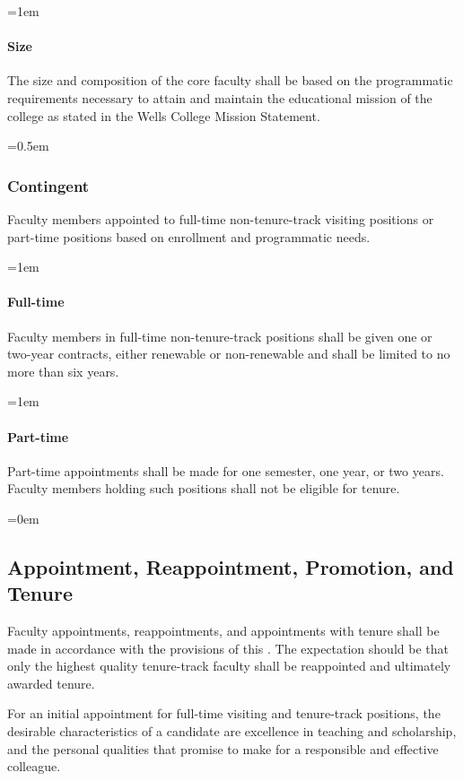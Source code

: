 \documentclass{manual}
\let\oldsubsection\subsection
\renewcommand\subsection{\leftskip=0em\oldsubsection}
\let\oldsubsubsection\subsubsection
\renewcommand\subsubsection{\leftskip=0.5em\oldsubsubsection}
\let\oldparagraph\paragraph
\renewcommand\paragraph{\leftskip=1em\oldparagraph}
\begin{document}
\paragraph{Size} 
The size and composition of the core faculty shall be based on the programmatic requirements necessary to attain and maintain the educational mission of the college as stated in the Wells College Mission Statement.

\subsubsection{Contingent}
Faculty members appointed to full-time non-tenure-track visiting positions or part-time positions based on enrollment and programmatic needs.

\paragraph{Full-time} 
Faculty members in full-time non-tenure-track positions shall be given one or two-year contracts, either renewable or non-renewable and shall be limited to no more than six years.

\paragraph{Part-time} 
Part-time appointments shall be made for one semester, one year, or two years. Faculty members holding such positions shall not be eligible for tenure.

\subsection{Appointment, Reappointment, Promotion, and Tenure}\label{sec:AppointmentReappointmentPromotionAndTenure}
Faculty appointments, reappointments, and appointments with tenure shall be made in accordance with the provisions of this . The expectation should be that only the highest quality tenure-track faculty shall be reappointed and ultimately awarded tenure.

For an initial appointment for full-time visiting and tenure-track positions, the desirable characteristics of a candidate are excellence in teaching and scholarship, and the personal qualities that promise to make for a responsible and effective colleague.
\end{document}

